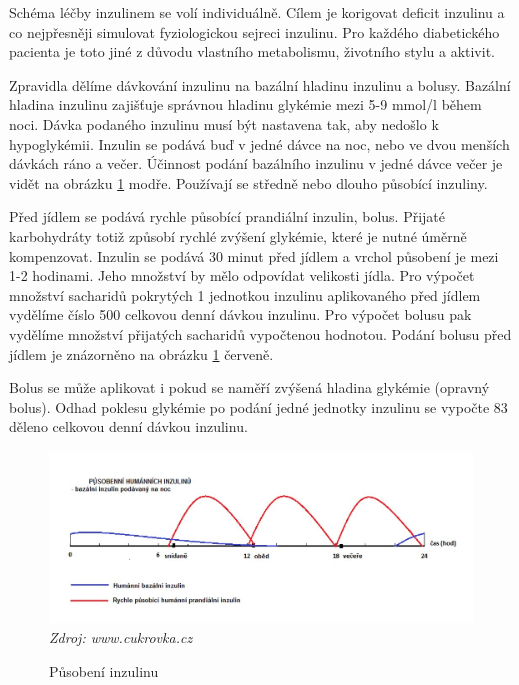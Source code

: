 Schéma léčby inzulinem se volí individuálně. Cílem je korigovat deficit inzulinu a co nejpřesněji simulovat fyziologickou sejreci inzulinu. Pro každého diabetického pacienta je toto jiné z důvodu vlastního metabolismu, životního stylu a aktivit.

Zpravidla dělíme dávkování inzulinu na bazální hladinu inzulinu a bolusy. Bazální hladina inzulinu zajišťuje správnou hladinu glykémie mezi 5-9 mmol/l během noci. Dávka podaného inzulinu musí být nastavena tak, aby nedošlo k hypoglykémii. Inzulin se podává buď v jedné dávce na noc, nebo ve dvou menších dávkách ráno a večer. Účinnost podání bazálního inzulinu v jedné dávce večer je vidět na obrázku \ref{fig:inzulin} modře. Používají se středně nebo dlouho působící inzuliny.

Před jídlem se podává rychle působící prandiální inzulin, bolus. Přijaté karbohydráty totiž způsobí rychlé zvýšení glykémie, které je nutné úměrně kompenzovat. Inzulin se podává 30 minut před jídlem a vrchol působení je mezi 1-2 hodinami. Jeho množství by mělo odpovídat velikosti jídla. Pro výpočet množství sacharidů pokrytých 1 jednotkou inzulinu aplikovaného před jídlem vydělíme číslo 500 celkovou denní dávkou inzulinu. Pro výpočet bolusu pak vydělíme množství přijatých sacharidů vypočtenou hodnotou. Podání bolusu před jídlem je znázorněno na obrázku \ref{fig:inzulin} červeně.

Bolus se může aplikovat i pokud se naměří zvýšená hladina glykémie (opravný bolus). Odhad poklesu glykémie po podání jedné jednotky inzulinu se vypočte 83 děleno celkovou denní dávkou inzulinu.
\cite{cukrovka.cz,Diabetes.Rybka,Inzulinove.rezimy}

\begin{figure}[H]
\caption{Působení inzulinu}
\label{fig:inzulin}
\centering
\includegraphics[width=1\textwidth]{img/diabetes/pusobeni-humannich-inzulinu.jpg}
\textit{Zdroj: www.cukrovka.cz \citep{cukrovka.cz}}
\end{figure}

